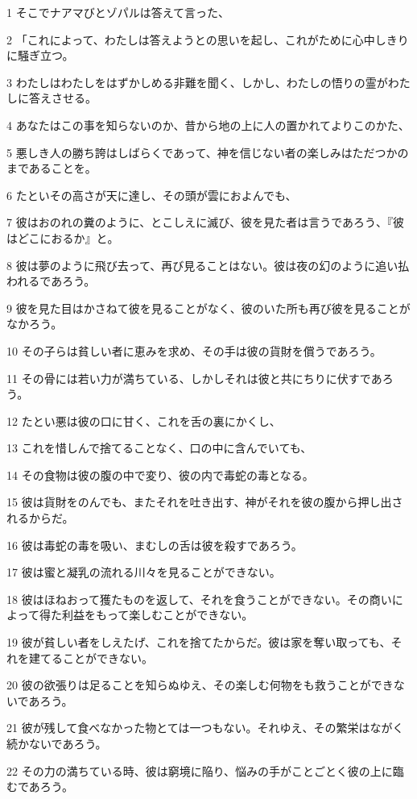\par 1 そこでナアマびとゾパルは答えて言った、
\par 2 「これによって、わたしは答えようとの思いを起し、これがために心中しきりに騒ぎ立つ。
\par 3 わたしはわたしをはずかしめる非難を聞く、しかし、わたしの悟りの霊がわたしに答えさせる。
\par 4 あなたはこの事を知らないのか、昔から地の上に人の置かれてよりこのかた、
\par 5 悪しき人の勝ち誇はしばらくであって、神を信じない者の楽しみはただつかのまであることを。
\par 6 たといその高さが天に達し、その頭が雲におよんでも、
\par 7 彼はおのれの糞のように、とこしえに滅び、彼を見た者は言うであろう、『彼はどこにおるか』と。
\par 8 彼は夢のように飛び去って、再び見ることはない。彼は夜の幻のように追い払われるであろう。
\par 9 彼を見た目はかさねて彼を見ることがなく、彼のいた所も再び彼を見ることがなかろう。
\par 10 その子らは貧しい者に恵みを求め、その手は彼の貨財を償うであろう。
\par 11 その骨には若い力が満ちている、しかしそれは彼と共にちりに伏すであろう。
\par 12 たとい悪は彼の口に甘く、これを舌の裏にかくし、
\par 13 これを惜しんで捨てることなく、口の中に含んでいても、
\par 14 その食物は彼の腹の中で変り、彼の内で毒蛇の毒となる。
\par 15 彼は貨財をのんでも、またそれを吐き出す、神がそれを彼の腹から押し出されるからだ。
\par 16 彼は毒蛇の毒を吸い、まむしの舌は彼を殺すであろう。
\par 17 彼は蜜と凝乳の流れる川々を見ることができない。
\par 18 彼はほねおって獲たものを返して、それを食うことができない。その商いによって得た利益をもって楽しむことができない。
\par 19 彼が貧しい者をしえたげ、これを捨てたからだ。彼は家を奪い取っても、それを建てることができない。
\par 20 彼の欲張りは足ることを知らぬゆえ、その楽しむ何物をも救うことができないであろう。
\par 21 彼が残して食べなかった物とては一つもない。それゆえ、その繁栄はながく続かないであろう。
\par 22 その力の満ちている時、彼は窮境に陥り、悩みの手がことごとく彼の上に臨むであろう。
